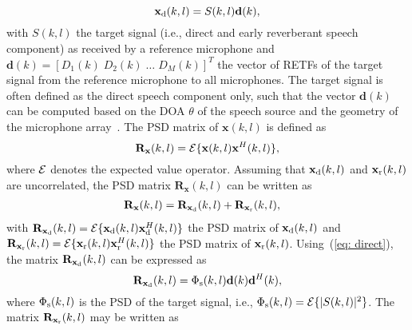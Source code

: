 \documentclass{article}
\begin{document}
\begin{equation}
\label{eq: direct}
\mathbf{x}_{\rm d}(k,l) = S(k,l)\mathbf{d}(k),
\end{equation}
with $S(k,l)$ the target signal (i.e., direct and early reverberant speech component) as received by a reference microphone and $\mathbf{d}(k) = [D_1(k) \; D_2(k) \; \ldots \; D_M(k)]^T$ the vector of RETFs of the target signal from the reference microphone to all microphones.
The target signal is often defined as the direct speech component only, such that the vector $\mathbf{d}(k)$ can be computed based on the DOA $\theta$ of the speech source and the geometry of the microphone array~\cite{Braun_EUSIPCO_2013,Kuklasinski_EUSIPCO_2014g,Kuklasinksi_ICASSP_2015,Braun_EURASIP_2015,Schwartz_WASPAA_2015,Schwartz_ICASSP_2016,Kuklasinski_ITASLP_2016,kuklasinski_AES_2016}. 
The PSD matrix of $\mathbf{x}(k,l)$ is defined as
\begin{equation}
\mathbf{R}_{\mathbf{x}}(k,l) = {\cal{E}} \{ \mathbf{x}(k,l) \mathbf{x}^H(k,l)\}, 
\end{equation}
where ${\cal{E}}$ denotes the expected value operator.
Assuming that $\mathbf{x}_{\rm d}(k,l)$ and $\mathbf{x}_{\rm r}(k,l)$ are uncorrelated, the PSD matrix $\mathbf{R}_{\mathbf{x}}(k,l)$ can be written as
\begin{align}
\label{eq: xcorr}
\mathbf{R}_{\mathbf{x}}(k,l) &= \mathbf{R}_{{\mathbf{x}}_{\rm d}}(k,l) + \mathbf{R}_{{\mathbf{x}}_{\rm r}}(k,l),
\end{align}
with $\mathbf{R}_{{\mathbf{x}}_{\rm d}}(k,l) = {\cal{E}} \{ \mathbf{x}_{\rm d}(k,l) \mathbf{x}^H_{\rm d}(k,l)\}$ the PSD matrix of $\mathbf{x}_{\rm d}(k,l)$ and $\mathbf{R}_{\mathbf{x}_{{\rm r}}}(k,l) = {\cal{E}} \{ \mathbf{x}_{\rm r}(k,l) \mathbf{x}^H_{\rm r}(k,l)\}$ the PSD matrix of $\mathbf{x}_{\rm r}(k,l)$.
Using~(\ref{eq: direct}), the matrix $\mathbf{R}_{\mathbf{x}_{{\rm d}}}(k,l)$ can be expressed as
\begin{equation}
\label{eq: corr_dir}
\mathbf{R}_{\mathbf{x}_{{\rm d}}}(k,l) = \Phi_{\rm s}(k,l) \mathbf{d}(k) \mathbf{d}^H(k),
\end{equation}
where $\Phi_{\rm s}(k,l)$ is the PSD of the target signal, i.e., $\Phi_{\rm s}(k,l) = {\cal{E}}\{|S(k,l)|^2\}$.
The matrix $\mathbf{R}_{\mathbf{x}_{{\rm r}}}(k,l)$ may be written as
\end{document}
